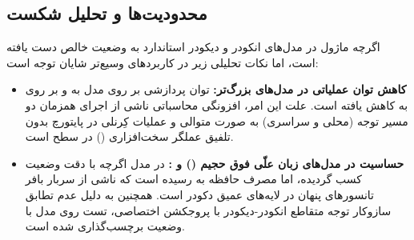 \subsection{محدودیت‌ها و تحلیل شکست}
اگرچه ماژول در مدل‌های انکودر و دیکودر استاندارد به وضعیت  خالص دست یافته است، اما نکات تحلیلی زیر در کاربردهای وسیع‌تر شایان توجه است:
\begin{itemize}
    \item \textbf{کاهش توان عملیاتی در مدل‌های بزرگ‌تر:} توان پردازشی بر روی مدل  به  و بر روی  به  کاهش یافته است. علت این امر، افزونگی محاسباتی ناشی از اجرای همزمان دو مسیر توجه (محلی و سراسری) به صورت متوالی و عملیات کِرنلی در پایتورچ بدون تلفیق عملگر سخت‌افزاری () در سطح  است.
    \item \textbf{حساسیت در مدل‌های زبان علّی فوق حجیم () و :} در مدل  اگرچه با دقت  وضعیت  کسب گردیده، اما مصرف حافظه به  رسیده است که ناشی از سربار بافر تانسورهای پنهان در لایه‌های عمیق دکودر است. همچنین به دلیل عدم تطابق سازوکار توجه متقاطع انکودر-دیکودر با پروجکشن اختصاصی، تست روی مدل  با وضعیت  برچسب‌گذاری شده است.
\end{itemize}
